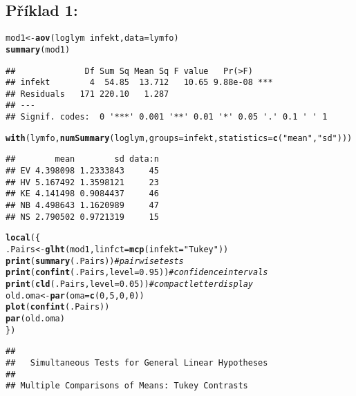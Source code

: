 \documentclass[twoside]{article}\usepackage[]{graphicx}\usepackage[]{color}
\makeatletter
\newcommand{\hlnum}[1]{\textcolor[rgb]{0.686,0.059,0.569}{#1}}%
\newcommand{\hlstr}[1]{\textcolor[rgb]{0.192,0.494,0.8}{#1}}%
\newcommand{\hlcom}[1]{\textcolor[rgb]{0.678,0.584,0.686}{\textit{#1}}}%
\newcommand{\hlopt}[1]{\textcolor[rgb]{0,0,0}{#1}}%
\newcommand{\hlstd}[1]{\textcolor[rgb]{0.345,0.345,0.345}{#1}}%
\newcommand{\hlkwb}[1]{\textcolor[rgb]{0.69,0.353,0.396}{#1}}%
\newcommand{\hlkwc}[1]{\textcolor[rgb]{0.333,0.667,0.333}{#1}}%
\newcommand{\hlkwd}[1]{\textcolor[rgb]{0.737,0.353,0.396}{\textbf{#1}}}%
\newenvironment{kframe}{%
 \def\at@end@of@kframe{}%
 \ifinner\ifhmode%
  \def\at@end@of@kframe{\end{minipage}}%
  \begin{minipage}{\columnwidth}%
 \fi\fi%
 \def\FrameCommand##1{\hskip\@totalleftmargin \hskip-\fboxsep
 \colorbox{shadecolor}{##1}\hskip-\fboxsep
     \hskip-\linewidth \hskip-\@totalleftmargin \hskip\columnwidth}%
 \MakeFramed {\advance\hsize-\width
   \@totalleftmargin\z@ \linewidth\hsize
   \@setminipage}}%
 {\par\unskip\endMakeFramed%
 \at@end@of@kframe}
\newenvironment{knitrout}{}{} %
\makeatother
\begin{document}
\subsection*{Příklad 1:}
\begin{knitrout}
\color{fgcolor}\begin{kframe}
\begin{alltt}
\hlstd{mod1} \hlkwb{<-} \hlkwd{aov}\hlstd{(loglym} \hlopt{~} \hlstd{infekt,} \hlkwc{data}\hlstd{=lymfo)}
\hlkwd{summary}\hlstd{(mod1)}
\end{alltt}
\begin{verbatim}
##              Df Sum Sq Mean Sq F value   Pr(>F)    
## infekt        4  54.85  13.712   10.65 9.88e-08 ***
## Residuals   171 220.10   1.287                     
## ---
## Signif. codes:  0 '***' 0.001 '**' 0.01 '*' 0.05 '.' 0.1 ' ' 1
\end{verbatim}
\begin{alltt}
\hlkwd{with}\hlstd{(lymfo,} \hlkwd{numSummary}\hlstd{(loglym,} \hlkwc{groups}\hlstd{=infekt,} \hlkwc{statistics}\hlstd{=}\hlkwd{c}\hlstd{(}\hlstr{"mean"}\hlstd{,} \hlstr{"sd"}\hlstd{)))}
\end{alltt}
\begin{verbatim}
##        mean        sd data:n
## EV 4.398098 1.2333843     45
## HV 5.167492 1.3598121     23
## KE 4.141498 0.9084437     46
## NB 4.498643 1.1620989     47
## NS 2.790502 0.9721319     15
\end{verbatim}
\begin{alltt}
\hlkwd{local}\hlstd{(\{}
  \hlstd{.Pairs} \hlkwb{<-} \hlkwd{glht}\hlstd{(mod1,} \hlkwc{linfct} \hlstd{=} \hlkwd{mcp}\hlstd{(}\hlkwc{infekt} \hlstd{=} \hlstr{"Tukey"}\hlstd{))}
  \hlkwd{print}\hlstd{(}\hlkwd{summary}\hlstd{(.Pairs))} \hlcom{# pairwise tests}
  \hlkwd{print}\hlstd{(}\hlkwd{confint}\hlstd{(.Pairs,} \hlkwc{level}\hlstd{=}\hlnum{0.95}\hlstd{))} \hlcom{# confidence intervals}
  \hlkwd{print}\hlstd{(}\hlkwd{cld}\hlstd{(.Pairs,} \hlkwc{level}\hlstd{=}\hlnum{0.05}\hlstd{))} \hlcom{# compact letter display}
  \hlstd{old.oma} \hlkwb{<-} \hlkwd{par}\hlstd{(}\hlkwc{oma}\hlstd{=}\hlkwd{c}\hlstd{(}\hlnum{0}\hlstd{,} \hlnum{5}\hlstd{,} \hlnum{0}\hlstd{,} \hlnum{0}\hlstd{))}
  \hlkwd{plot}\hlstd{(}\hlkwd{confint}\hlstd{(.Pairs))}
  \hlkwd{par}\hlstd{(old.oma)}
\hlstd{\})}
\end{alltt}
\begin{verbatim}
## 
## 	 Simultaneous Tests for General Linear Hypotheses
## 
## Multiple Comparisons of Means: Tukey Contrasts

\end{verbatim}
\end{kframe}
\end{knitrout}
\end{document}
